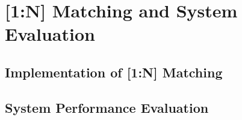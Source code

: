 \section{[1:N] Matching and System Evaluation}

\subsection{Implementation of [1:N] Matching}
\subsection{System Performance Evaluation}
